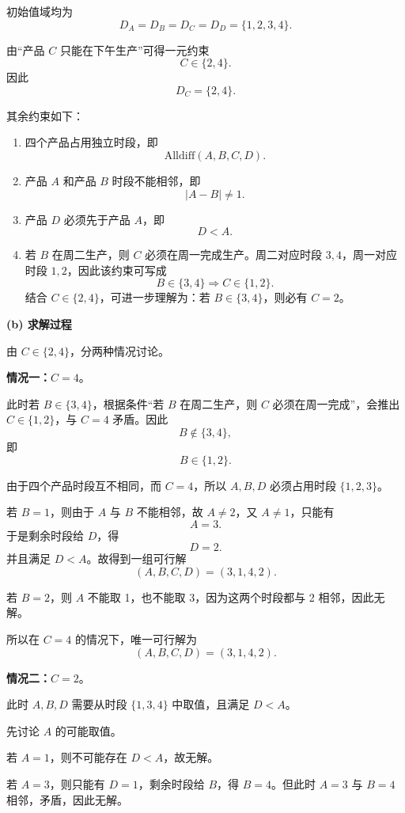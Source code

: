 \documentclass[a4paper]{article}
\begin{document}
\begin{enumerate}
\begin{solution}
初始值域均为
\[
D_A=D_B=D_C=D_D=\{1,2,3,4\}.
\]

由“产品 \(C\) 只能在下午生产”可得一元约束
\[
C\in\{2,4\}.
\]
因此
\[
D_C=\{2,4\}.
\]

其余约束如下：

\begin{enumerate}[label=\arabic*)]
  \item 四个产品占用独立时段，即
  \[
  \mathrm{Alldiff}(A,B,C,D).
  \]

  \item 产品 \(A\) 和产品 \(B\) 时段不能相邻，即
  \[
  |A-B|\neq 1.
  \]

  \item 产品 \(D\) 必须先于产品 \(A\)，即
  \[
  D<A.
  \]

  \item 若 \(B\) 在周二生产，则 \(C\) 必须在周一完成生产。周二对应时段 \(3,4\)，周一对应时段 \(1,2\)，因此该约束可写成
  \[
  B\in\{3,4\}\Rightarrow C\in\{1,2\}.
  \]
  结合 \(C\in\{2,4\}\)，可进一步理解为：若 \(B\in\{3,4\}\)，则必有 \(C=2\)。
\end{enumerate}

\textbf{(b) 求解过程}

由 \(C\in\{2,4\}\)，分两种情况讨论。

\textbf{情况一：}\(C=4\)。

此时若 \(B\in\{3,4\}\)，根据条件“若 \(B\) 在周二生产，则 \(C\) 必须在周一完成”，会推出 \(C\in\{1,2\}\)，与 \(C=4\) 矛盾。因此
\[
B\notin\{3,4\},
\]
即
\[
B\in\{1,2\}.
\]

由于四个产品时段互不相同，而 \(C=4\)，所以 \(A,B,D\) 必须占用时段 \(\{1,2,3\}\)。

若 \(B=1\)，则由于 \(A\) 与 \(B\) 不能相邻，故 \(A\neq 2\)，又 \(A\neq 1\)，只能有
\[
A=3.
\]
于是剩余时段给 \(D\)，得
\[
D=2.
\]
并且满足 \(D<A\)。故得到一组可行解
\[
(A,B,C,D)=(3,1,4,2).
\]

若 \(B=2\)，则 \(A\) 不能取 1，也不能取 3，因为这两个时段都与 2 相邻，因此无解。

所以在 \(C=4\) 的情况下，唯一可行解为
\[
(A,B,C,D)=(3,1,4,2).
\]

\textbf{情况二：}\(C=2\)。

此时 \(A,B,D\) 需要从时段 \(\{1,3,4\}\) 中取值，且满足 \(D<A\)。

先讨论 \(A\) 的可能取值。

若 \(A=1\)，则不可能存在 \(D<A\)，故无解。

若 \(A=3\)，则只能有 \(D=1\)，剩余时段给 \(B\)，得 \(B=4\)。但此时 \(A=3\) 与 \(B=4\) 相邻，矛盾，因此无解。


\end{solution}
\end{enumerate}
\end{document}
